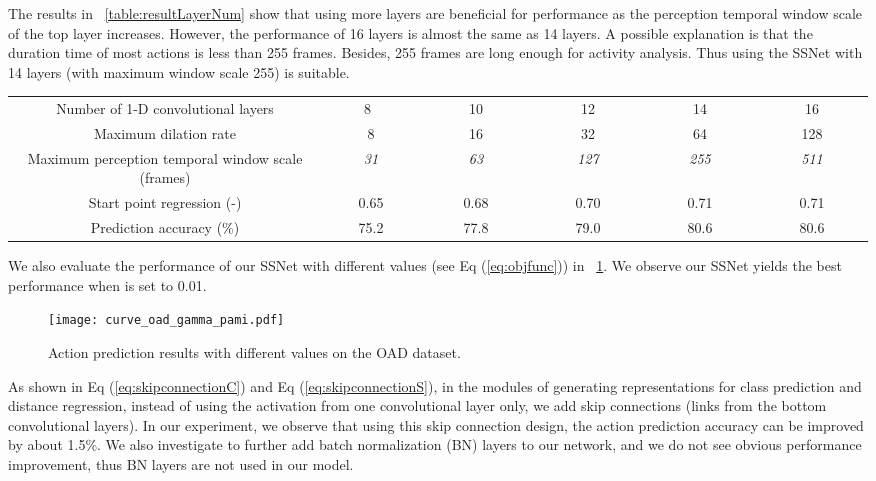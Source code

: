 \documentclass[10pt,twocolumn,letterpaper]{article}
\begin{document}
The results in \tablename{~\ref{table:resultLayerNum}} show that
using more layers are beneficial for performance as the perception temporal window scale of the top layer increases.
However, the performance of 16 layers is almost the same as 14 layers.
A possible explanation is that the duration time of most actions is less than 255 frames.
Besides, 255 frames are long enough for activity analysis.
Thus using the SSNet with 14 layers (with maximum window scale 255) is suitable.
\begin{table*}[tbp]
	\caption{Evaluation of different configurations of the proposed network on the OAD dataset.}
	\label{table:resultLayerNum}
	\centering
	\small
	\begin{tabular}{cccccc}
		\toprule
Number of 1-D convolutional layers                &~~~~~8~~~~~~&  ~~~~~~10~~~~~~ & ~~~~~~12~~~~~~   & ~~~~~~14~~~~~~   & ~~~~~~16~~~~~~   \\
		Maximum dilation rate                             &      8     &       16        &      32          &      64          &      128     \\
		Maximum perception temporal window scale (frames) & \emph{31}  &  \emph{63}      &    \emph{127}    &   \emph{255}     & \emph{511}   \\
		\midrule
		Start point regression (-)             &   0.65     &     0.68        &     0.70         &     0.71         &    0.71  \\
		Prediction accuracy (\%)                          &   75.2     &     77.8        &     79.0         &     80.6         &    80.6 \\
		\bottomrule
	\end{tabular}
\end{table*}

We also evaluate the performance of our SSNet with different  values (see Eq (\ref{eq:objfunc}))
in \figurename{~\ref{fig:result_curves_ChaLearn_gamma}}.
We observe our SSNet yields the best performance when  is set to 0.01.

\begin{figure}[tbp]
		\centering
		\centerline{\texttt{[image: curve\_oad\_gamma\_pami.pdf]}}
	\caption{Action prediction results with different  values on the OAD dataset.}
	\label{fig:result_curves_ChaLearn_gamma}
\end{figure}

As shown in Eq (\ref{eq:skipconnectionC}) and Eq (\ref{eq:skipconnectionS}),
in the modules of generating representations for class prediction and distance regression,
instead of using the activation from one convolutional layer only,
we add skip connections (links from the bottom convolutional layers).
In our experiment, we observe that using this skip connection design, the action prediction accuracy can be improved by about 1.5\%.
We also investigate to further add batch normalization (BN) layers \cite{ioffe2015batch} to our network,
and we do not see obvious performance improvement,
thus BN layers are not used in our model.
\end{document}
